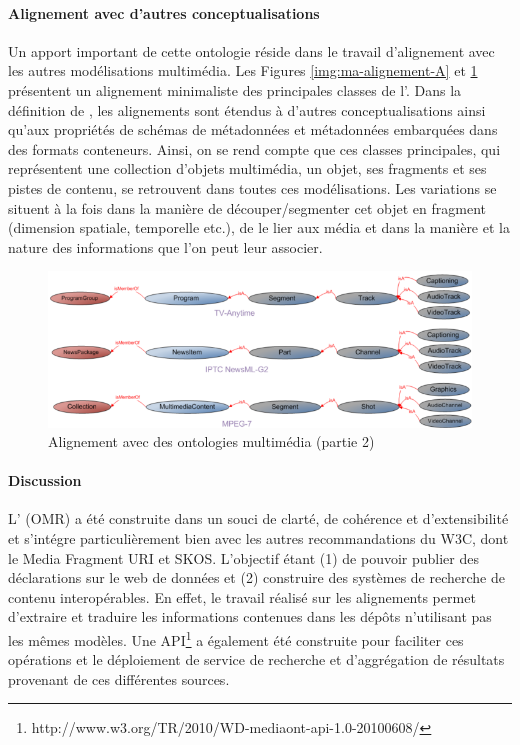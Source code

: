 \paragraph{Alignement avec d'autres conceptualisations}
Un apport important de cette ontologie réside dans le travail d'alignement avec les autres modélisations multimédia. 
Les Figures \ref{img:ma-alignement-A} et \ref{img:ma-alignement-B} présentent un alignement minimaliste des principales classes de l'.
Dans la définition de \cite{Lee2012}, les alignements sont étendus à d'autres conceptualisations ainsi qu'aux propriétés de schémas de métadonnées et métadonnées embarquées dans des formats conteneurs.
Ainsi, on se rend compte que ces classes principales, qui représentent une collection d'objets multimédia, un objet, ses fragments et ses pistes de contenu, se retrouvent dans toutes ces modélisations. 
Les variations se situent à la fois dans la manière de découper/segmenter cet objet en fragment (dimension spatiale, temporelle etc.), de le lier aux média et dans la manière et la nature des informations que l'on peut leur associer.

\begin{figure}[ht!]
\centering
\includegraphics[width=\textwidth]{images/MA-alignement-B.png}
\caption{Alignement avec des ontologies multimédia (partie 2)}
\label{img:ma-alignement-B}
\end{figure}

\paragraph{Discussion}
L' (OMR) a été construite dans un souci de clarté, de cohérence et d'extensibilité et s'intégre particulièrement bien avec les autres recommandations du W3C, dont le Media Fragment URI et SKOS.
L'objectif étant (1) de pouvoir publier des déclarations sur le web de données et (2) construire des systèmes de recherche de contenu interopérables. 
En effet, le travail réalisé sur les alignements permet d'extraire et traduire les informations contenues dans les dépôts n'utilisant pas les mêmes modèles.
Une API\footnote{http://www.w3.org/TR/2010/WD-mediaont-api-1.0-20100608/} a également été construite pour faciliter ces opérations et le déploiement de service de recherche et d'aggrégation de résultats provenant de ces différentes sources.

